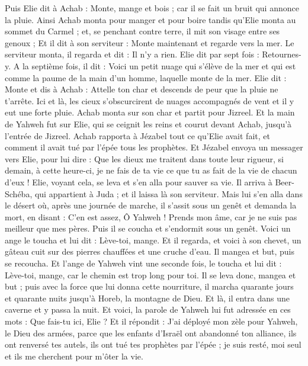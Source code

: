 \begin{multicols}{2}
Puis Elie dit à Achab : Monte, mange et bois ; car il se fait un bruit qui annonce la pluie.
Ainsi Achab monta pour manger et pour boire tandis qu’Elie monta au sommet du Carmel ; et, se penchant contre terre, il mit son visage entre ses genoux ;
Et il dit à son serviteur : Monte maintenant et regarde vers la mer. Le serviteur monta, il regarda et dit : Il n'y a rien. Elie dit par sept fois : Retournes-y.
A la septième fois, il dit : Voici un petit nuage qui s’élève de la mer et qui est comme la paume de la main d'un homme, laquelle monte de la mer. Elie dit : Monte et dis à Achab : Attelle ton char et descends de peur que la pluie ne t’arrête.
Ici et là, les cieux s'obscurcirent de nuages accompagnés de vent et il y eut une forte pluie. Achab monta sur son char et partit pour Jizreel.
Et la main de Yahweh fut sur Elie, qui se ceignit les reins et courut devant Achab, jusqu'à l'entrée de Jizreel.
\VerseOne{}Achab rapporta à Jézabel tout ce qu'Elie avait fait, et comment il avait tué par l'épée tous les prophètes.
Et Jézabel envoya un messager vers Elie, pour lui dire : Que les dieux me traitent dans toute leur rigueur, si demain, à cette heure-ci, je ne fais de ta vie ce que tu as fait de la vie de chacun d'eux !
Elie, voyant cela, se leva et s'en alla pour sauver sa vie. Il arriva à Beer-Schéba, qui appartient à Juda ; et il laissa là son serviteur.
Mais lui s'en alla dans le désert où, après une journée de marche, il s'assit sous un genêt et demanda la mort, en disant : C'en est assez, Ô Yahweh ! Prends mon âme, car je ne suis pas meilleur que mes pères.
Puis il se coucha et s'endormit sous un genêt. Voici un ange le toucha et lui dit : Lève-toi, mange.
Et il regarda, et voici à son chevet, un gâteau cuit sur des pierres chauffées et une cruche d'eau. Il mangea et but, puis se recoucha.
Et l'ange de Yahweh vint une seconde fois, le toucha et lui dit : Lève-toi, mange, car le chemin est trop long pour toi.
Il se leva donc, mangea et but ; puis avec la force que lui donna cette nourriture, il marcha quarante jours et quarante nuits jusqu'à Horeb, la montagne de Dieu.
Et là, il entra dans une caverne et y passa la nuit. Et voici, la parole de Yahweh lui fut adressée en ces mots : Que fais-tu ici, Elie ?
Et il répondit : J'ai déployé mon zèle pour Yahweh, le Dieu des armées, parce que les enfants d'Israël ont abandonné ton alliance, ils ont renversé tes autels, ils ont tué tes prophètes par l'épée ; je suis resté, moi seul et ils me cherchent pour m'ôter la vie.

\end{multicols}
